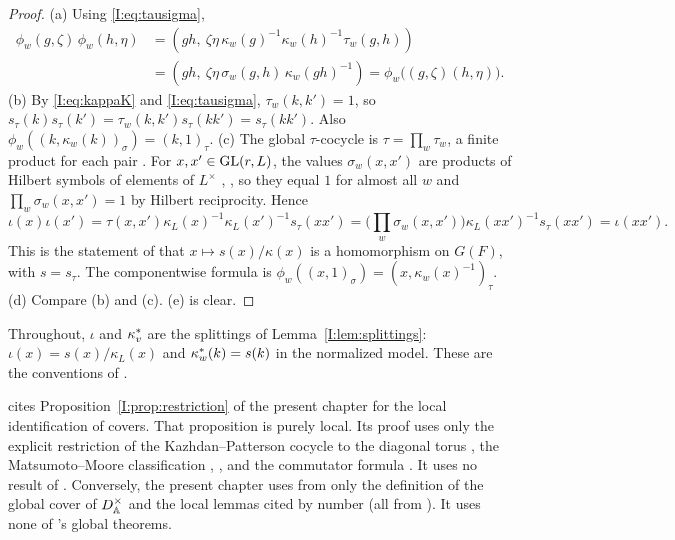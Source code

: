 \begin{proof}
(a) Using \eqref{I:eq:tausigma},
\begin{align*} \phi_w(g,\zeta)\,\phi_w(h,\eta)&=(gh,\ \zeta\eta\,\kappa_w(g)^{-1}\kappa_w(h)^{-1}\tau_w(g,h))\\ &=(gh,\ \zeta\eta\,\sigma_w(g,h)\,\kappa_w(gh)^{-1})=\phi_w\big((g,\zeta)(h,\eta)\big). \end{align*}
(b) By \eqref{I:eq:kappaK} and \eqref{I:eq:tausigma}, $\tau_w(k,k')=1$, so $s_\tau(k)s_\tau(k')=\tau_w(k,k')s_\tau(kk')=s_\tau(kk')$. Also $\phi_w((k,\kappa_w(k))_\sigma)=(k,1)_\tau$.
(c) The global $\tau$-cocycle is $\tau=\prod_w\tau_w$, a finite product for each pair \cite[\S2]{FK86}. For $x,x'\in\mathrm{GL}(r,L)$, the values $\sigma_w(x,x')$ are products of Hilbert symbols of elements of $L^\times$ \cite[\S0.1]{KP84}, \cite{BLS99}, so they equal $1$ for almost all $w$ and $\prod_w\sigma_w(x,x')=1$ by Hilbert reciprocity. Hence
\[ \iota(x)\iota(x')=\tau(x,x')\kappa_L(x)^{-1}\kappa_L(x')^{-1}s_\tau(xx')=\Big(\prod_w\sigma_w(x,x')\Big)\kappa_L(xx')^{-1}s_\tau(xx')=\iota(xx'). \]
This is the statement of \cite[\S2]{FK86} that $x\mapsto s(x)/\kappa(x)$ is a homomorphism on $G(F)$, with $s=s_\tau$. The componentwise formula is $\phi_w((x,1)_\sigma)=(x,\kappa_w(x)^{-1})_\tau$.
(d) Compare (b) and (c). (e) is clear.
\end{proof}

\begin{remark}[Conventions]\label{I:rem:JCsplitting}
Throughout, $\iota$ and $\kappa^{*}_v$ are the splittings of Lemma~\ref{I:lem:splittings}: $\iota(x)=s(x)/\kappa_L(x)$ and $\kappa^{*}_w(k)=s(k)$ in the normalized model. These are the conventions of \cite[Lemma~6.1(a),(d)]{JC26a}.
\end{remark}

\begin{remark}\label{I:rem:nocirc}
\cite{JC26a} cites Proposition~\ref{I:prop:restriction} of the present chapter for the local identification of covers. That proposition is purely local. Its proof uses only the explicit restriction of the Kazhdan--Patterson cocycle to the diagonal torus \cite[\S2]{FK86}, the Matsumoto--Moore classification \cite{Mat69}, \cite{Moo68}, and the commutator formula \cite{Mil71}. It uses no result of \cite{JC26a}. Conversely, the present chapter uses from \cite{JC26a} only the definition of the global cover of $D^\times_{\mathbb{A}}$ and the local lemmas cited by number (all from \cite[\S\S2--4]{JC26a}). It uses none of \cite{JC26a}'s global theorems.
\end{remark}

